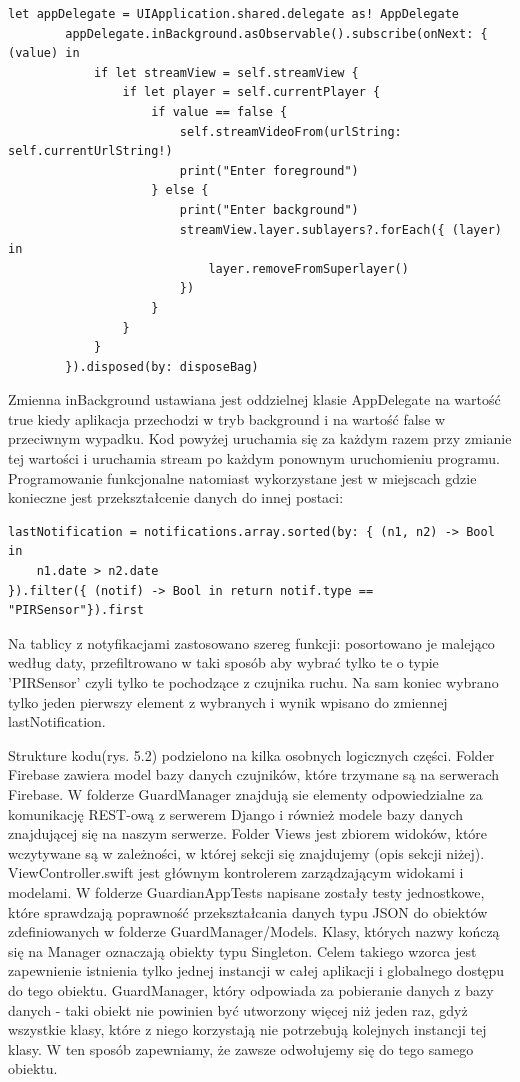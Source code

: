 \begin{verbatim}
let appDelegate = UIApplication.shared.delegate as! AppDelegate
        appDelegate.inBackground.asObservable().subscribe(onNext: { (value) in
            if let streamView = self.streamView {
                if let player = self.currentPlayer {
                    if value == false {
                        self.streamVideoFrom(urlString: self.currentUrlString!)
                        print("Enter foreground")
                    } else {
                        print("Enter background")
                        streamView.layer.sublayers?.forEach({ (layer) in
                            layer.removeFromSuperlayer()
                        })
                    }
                }
            }
        }).disposed(by: disposeBag)
\end{verbatim}
Zmienna inBackground ustawiana jest oddzielnej klasie AppDelegate na wartość true kiedy aplikacja przechodzi w tryb background i na wartość false w przeciwnym wypadku. Kod powyżej uruchamia się za każdym razem przy zmianie tej wartości i uruchamia stream po każdym ponownym uruchomieniu programu.
Programowanie funkcjonalne natomiast wykorzystane jest w miejscach gdzie konieczne jest przekształcenie danych do innej postaci:
\begin{verbatim}
lastNotification = notifications.array.sorted(by: { (n1, n2) -> Bool in
	n1.date > n2.date 
}).filter({ (notif) -> Bool in return notif.type == "PIRSensor"}).first
\end{verbatim}
Na tablicy z notyfikacjami zastosowano szereg funkcji: posortowano je malejąco według daty, przefiltrowano w taki sposób aby wybrać tylko te o typie 'PIRSensor' czyli tylko te pochodzące z czujnika ruchu. Na sam koniec wybrano tylko jeden pierwszy element z wybranych i wynik wpisano do zmiennej lastNotification.

Strukture kodu(rys. 5.2) podzielono na kilka osobnych logicznych części. Folder Firebase zawiera model bazy danych czujników, które trzymane są na serwerach Firebase. W folderze GuardManager znajdują sie elementy odpowiedzialne za komunikację REST-ową z serwerem Django i również modele bazy danych znajdującej się na naszym serwerze. Folder Views jest zbiorem widoków, które wczytywane są w zależności, w której sekcji się znajdujemy (opis sekcji niżej). ViewController.swift jest głównym kontrolerem zarządzającym widokami i modelami. W folderze GuardianAppTests napisane zostały testy jednostkowe, które sprawdzają poprawność przekształcania danych typu JSON do obiektów zdefiniowanych w folderze GuardManager/Models. Klasy, których nazwy kończą się na Manager oznaczają obiekty typu Singleton. Celem takiego wzorca jest zapewnienie istnienia tylko jednej instancji w całej aplikacji i globalnego dostępu do tego obiektu. GuardManager, który odpowiada za pobieranie danych z bazy danych - taki obiekt nie powinien być utworzony więcej niż jeden raz, gdyż wszystkie klasy, które z niego korzystają nie potrzebują kolejnych instancji tej klasy. W ten sposób zapewniamy, że zawsze odwołujemy się do tego samego obiektu.

